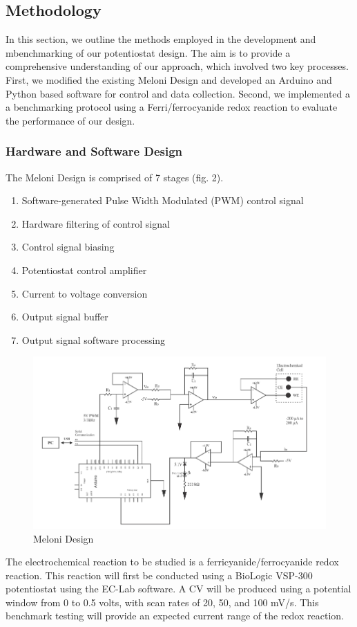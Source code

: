 \documentclass{article}
\begin{document}
\subsection*{Methodology}

In this section, we outline the methods employed in the development and mbenchmarking of our potentiostat design. The aim is to provide a comprehensive understanding of our approach, which involved two key processes. First, we modified the existing Meloni Design and developed an Arduino and Python based software for control and data collection. Second, we implemented a a benchmarking protocol using a Ferri/ferrocyanide redox reaction to evaluate the performance of our design. 

\subsubsection*{Hardware and Software Design}

The Meloni Design is comprised of 7 stages (fig. 2).
\begin{enumerate}
    \item Software-generated Pulse Width Modulated (PWM) control signal
    \item Hardware filtering of control signal
    \item Control signal biasing
    \item Potentiostat control amplifier
    \item Current to voltage conversion
    \item Output signal buffer
    \item Output signal software processing
\end{enumerate}

\begin{figure}[H]
    \centering
    \includegraphics[width=.5\linewidth]{meloni_design.png}
    \caption{Meloni Design}
\end{figure}

The electrochemical reaction to be studied is a ferricyanide/ferrocyanide redox reaction. This reaction will first be conducted using a BioLogic VSP-300 potentiostat using the EC-Lab software. A CV will be produced using a potential window from 0 to 0.5 volts, with scan rates of 20, 50, and 100 mV/s. This benchmark testing will provide an expected current range of the redox reaction. 
\end{document}
